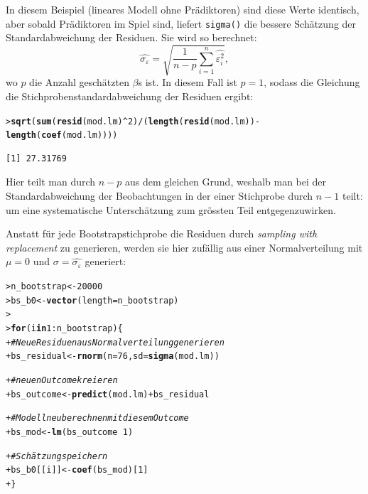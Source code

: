 \documentclass[oneside, 10pt]{book}\usepackage[]{graphicx}\usepackage[]{xcolor}
\makeatletter
\newcommand{\hlnum}[1]{\textcolor[rgb]{0.686,0.059,0.569}{#1}}%
\newcommand{\hlcom}[1]{\textcolor[rgb]{0.678,0.584,0.686}{\textit{#1}}}%
\newcommand{\hlopt}[1]{\textcolor[rgb]{0,0,0}{#1}}%
\newcommand{\hlstd}[1]{\textcolor[rgb]{0.345,0.345,0.345}{#1}}%
\newcommand{\hlkwa}[1]{\textcolor[rgb]{0.161,0.373,0.58}{\textbf{#1}}}%
\newcommand{\hlkwb}[1]{\textcolor[rgb]{0.69,0.353,0.396}{#1}}%
\newcommand{\hlkwc}[1]{\textcolor[rgb]{0.333,0.667,0.333}{#1}}%
\newcommand{\hlkwd}[1]{\textcolor[rgb]{0.737,0.353,0.396}{\textbf{#1}}}%
\newenvironment{kframe}{%
 \def\at@end@of@kframe{}%
 \ifinner\ifhmode%
  \def\at@end@of@kframe{\end{minipage}}%
  \begin{minipage}{\columnwidth}%
 \fi\fi%
 \def\FrameCommand##1{\hskip\@totalleftmargin \hskip-\fboxsep
 \colorbox{shadecolor}{##1}\hskip-\fboxsep
     \hskip-\linewidth \hskip-\@totalleftmargin \hskip\columnwidth}%
 \MakeFramed {\advance\hsize-\width
   \@totalleftmargin\z@ \linewidth\hsize
   \@setminipage}}%
 {\par\unskip\endMakeFramed%
 \at@end@of@kframe}
\newenvironment{knitrout}{}{} %
\makeatother
\begin{document}
In diesem Beispiel (lineares Modell ohne Prädiktoren)
sind diese Werte identisch, aber sobald Prädiktoren
im Spiel sind, liefert \texttt{sigma()} die bessere Schätzung
der Standardabweichung der Residuen. Sie wird so berechnet:
\begin{equation}\label{eq:sigmap}
\widehat{\sigma_{\varepsilon}} = \sqrt{\frac{1}{n - p} \sum_{i = 1}^{n} \widehat{\varepsilon_i^2}},
\end{equation}
wo $p$ die
Anzahl geschätzten $\beta$s ist.
In diesem Fall ist $p = 1$, sodass die Gleichung die
Stich\-proben\-standard\-ab\-weichung der Residuen ergibt:
\begin{knitrout}
\color{fgcolor}\begin{kframe}
\begin{alltt}
\hlstd{> }\hlkwd{sqrt}\hlstd{(}\hlkwd{sum}\hlstd{(}\hlkwd{resid}\hlstd{(mod.lm)}\hlopt{^}\hlnum{2}\hlstd{)}\hlopt{/}\hlstd{(}\hlkwd{length}\hlstd{(}\hlkwd{resid}\hlstd{(mod.lm))} \hlopt{-} \hlkwd{length}\hlstd{(}\hlkwd{coef}\hlstd{(mod.lm))))}
\end{alltt}
\begin{verbatim}
[1] 27.31769
\end{verbatim}
\end{kframe}
\end{knitrout}
Hier teilt man durch $n-p$ aus dem gleichen Grund,
weshalb man bei der Standardabweichung der Beobachtungen
in der einer Stichprobe durch $n-1$ teilt: um eine systematische
Unterschätzung zum grössten Teil entgegenzuwirken.

Anstatt für jede Bootstrapstichprobe die Residuen
durch \textit{sampling with replacement} zu generieren,
werden sie hier zufällig aus einer Normalverteilung
mit $\mu = 0$ und $\sigma = \widehat{\sigma_{\varepsilon}}$ generiert:

\begin{knitrout}
\color{fgcolor}\begin{kframe}
\begin{alltt}
\hlstd{> }\hlstd{n_bootstrap} \hlkwb{<-} \hlnum{20000}
\hlstd{> }\hlstd{bs_b0} \hlkwb{<-} \hlkwd{vector}\hlstd{(}\hlkwc{length} \hlstd{= n_bootstrap)}
\hlstd{> }
\hlstd{> }\hlkwa{for} \hlstd{(i} \hlkwa{in} \hlnum{1}\hlopt{:}\hlstd{n_bootstrap) \{}
\hlstd{+ }  \hlcom{# Neue Residuen aus Normalverteilung generieren}
\hlstd{+ }  \hlstd{bs_residual} \hlkwb{<-} \hlkwd{rnorm}\hlstd{(}\hlkwc{n} \hlstd{=} \hlnum{76}\hlstd{,} \hlkwc{sd} \hlstd{=} \hlkwd{sigma}\hlstd{(mod.lm))}

\hlstd{+ }  \hlcom{# neuen Outcome kreieren}
\hlstd{+ }  \hlstd{bs_outcome} \hlkwb{<-} \hlkwd{predict}\hlstd{(mod.lm)} \hlopt{+} \hlstd{bs_residual}

\hlstd{+ }  \hlcom{# Modell neu berechnen mit diesem Outcome}
\hlstd{+ }  \hlstd{bs_mod} \hlkwb{<-} \hlkwd{lm}\hlstd{(bs_outcome} \hlopt{~} \hlnum{1}\hlstd{)}

\hlstd{+ }  \hlcom{# Schätzung speichern}
\hlstd{+ }  \hlstd{bs_b0[[i]]} \hlkwb{<-} \hlkwd{coef}\hlstd{(bs_mod)[}\hlnum{1}\hlstd{]}
\hlstd{+ }\hlstd{\}}
\end{alltt}
\end{kframe}
\end{knitrout}
\end{document}
